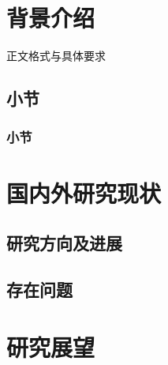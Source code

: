\section{背景介绍}
\par 正文格式与具体要求\cite{zjuthesisrules}\cite{zjugradthesisrules}

\subsection{小节}

\subsubsection{小节}

\section{国内外研究现状}

\subsection{研究方向及进展}

\subsection{存在问题}

\section{研究展望}
